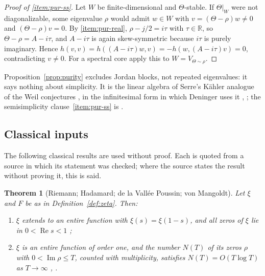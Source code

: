 \documentclass[11pt]{amsart}
\theoremstyle{plain}
\newtheorem{theorem}{Theorem}[section]
\theoremstyle{definition}
\theoremstyle{remark}
\numberwithin{equation}{section}
\newcommand{\R}{\mathbb{R}}
\DeclareMathOperator{\Ima}{Im}
\DeclareMathOperator{\Rea}{Re}
\renewcommand{\Re}{\Rea}
\renewcommand{\Im}{\Ima}
\begin{document}
\begin{proof}[Proof of \ref{item:pur-ss}]
Let $W$ be finite-dimensional and $\Theta$-stable. If $\Theta|_W$ were
not diagonalizable, some eigenvalue $\rho$ would admit $w\in W$ with
$v=(\Theta-\rho)w\ne0$ and $(\Theta-\rho)v=0$. By
\ref{item:pur-real}, $\rho-j/2=i\tau$ with $\tau\in\R$, so
$\Theta-\rho=A-i\tau$, and $A-i\tau$ is again skew-symmetric because
$i\tau$ is purely imaginary. Hence
$h(v,v)=h((A-i\tau)w,v)=-h(w,(A-i\tau)v)=0$, contradicting $v\ne0$.
For a spectral core apply this to $W=V_{\Theta\sim\rho}$.
\end{proof}

Proposition~\ref{prop:purity} excludes Jordan blocks, not repeated
eigenvalues: it says nothing about simplicity.
It is the linear algebra of Serre's K\"ahler analogue of the Weil
conjectures \cite[Th\'eor\`eme~1, pp.~392--393]{Serre1960Analogues}, in
the infinitesimal form in which Deninger uses it
\cite[(7.11)--(7.13), pp.~32--33]{Deninger1994Motivic},
\cite[p.~169]{Deninger1998Analogies}; the semisimplicity
clause~\ref{item:pur-ss} is \cite[2.7, p.~3]{Deninger2022NoWeil}.


\subsection{Classical inputs}\label{sec:classical}

The following classical results are used without proof. Each is quoted
from a source in which its statement was checked; where the source
states the result without proving it, this is said.

\begin{theorem}[Riemann; Hadamard; de la Vall\'ee Poussin; von
Mangoldt]\label{thm:imp-riemann}
Let $\xi$ and $F$ be as in Definition~\ref{def:zeta}. Then:
\begin{enumerate}[label=(\roman*)]
\item\label{item:riem-entire} $\xi$ extends to an entire function with
  $\xi(s)=\xi(1-s)$, and all zeros of $\xi$ lie in $0<\Re s<1$
  \cite[Theorem~17.17]{Sutherland2017Lecture17};
\item\label{item:riem-order} $\xi$ is an entire function of order one,
  and the number $N(T)$ of its zeros $\rho$ with $0<\Im\rho\le T$,
  counted with multiplicity, satisfies $N(T)=O(T\log T)$ as
  $T\to\infty$ \cite[pp.~12--14]{PerezMarco2018NotesRH},
  \cite[p.~4]{Riemann1859Wilkins}.
\end{enumerate}
\end{theorem}
\end{document}
